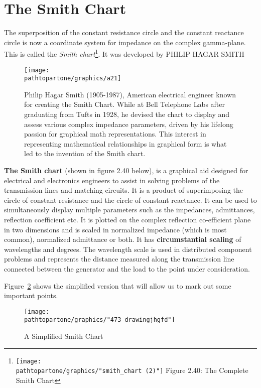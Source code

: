 \section{The Smith Chart}
The superposition of the constant resistance circle and the constant reactance circle is now a coordinate system for impedance on the complex gamma-plane. This is called the \emph{Smith chart}\footnote{
\centering
\texttt{[image: \\pathtopartone/graphics/"smith\_chart (2)"]}
\centering
Figure 2.40: The Complete Smith Chart
}. It was developed by PHILIP HAGAR SMITH
\begin{figure}[h]
\texttt{[image: \\pathtopartone/graphics/a21]}


Philip Hagar Smith (1905-1987), American electrical engineer known for creating the Smith Chart. While at Bell Telephone Labs after graduating from Tufts in 1928, he devised the chart to display and assess various complex impedance parameters, driven by his lifelong passion for graphical math representations. This interest in representing mathematical relationships in graphical form is what led to the invention of the Smith chart.
\label{fig:smithchart-2}
\end{figure}

\textbf{The Smith chart} (shown in figure 2.40 below), is a graphical aid designed for electrical and electronics engineers to assist in solving problems of the transmission lines and matching circuits. It is a product of superimposing the circle of constant resistance and the circle of constant reactance. It can be used to simultaneously display multiple parameters such as the impedances, admittances, reflection coefficient etc.
It is plotted on the complex reflection co-efficient plane in two dimensions and is scaled in normalized impedance (which is most common), normalized admittance or both. It has \textbf{circumstantial scaling} of wavelengths and degrees. The wavelength scale is used in distributed component problems and represents the distance measured along the transmission line connected between the generator and the load to the point under consideration.

Figure~\ref{fig:473-drawingjhgfd} shows the simplified version that will allow us to mark out some important points.
\begin{figure}[h]
\centering
\texttt{[image: \\pathtopartone/graphics/"473 drawingjhgfd"]}
\caption{A Simplified Smith Chart}
\label{fig:473-drawingjhgfd}
\end{figure}

